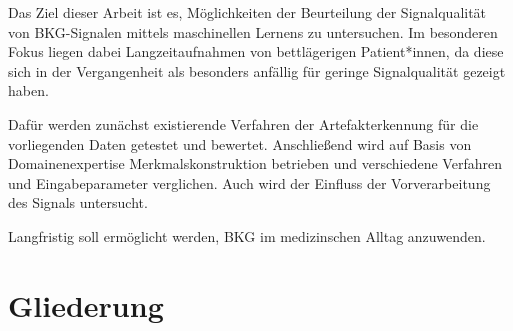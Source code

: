 Das Ziel dieser Arbeit ist es, Möglichkeiten der Beurteilung der Signalqualität von \ac{BKG}-Signalen mittels maschinellen Lernens zu untersuchen. Im besonderen Fokus liegen dabei Langzeitaufnahmen von bettlägerigen Patient*innen, da diese sich in der Vergangenheit als besonders anfällig für geringe Signalqualität gezeigt haben.

Dafür werden zunächst existierende Verfahren der Artefakterkennung für die vorliegenden Daten getestet und bewertet. Anschließend wird auf Basis von Domainenexpertise Merkmalskonstruktion betrieben und verschiedene Verfahren und Eingabeparameter verglichen. Auch wird der Einfluss der Vorverarbeitung des Signals untersucht. %

Langfristig soll ermöglicht werden, \acf{BKG} im medizinschen Alltag anzuwenden. %




\section{Gliederung}
